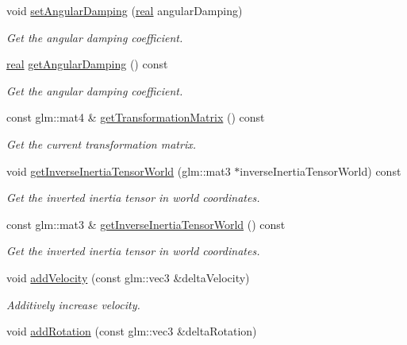 \begin{DoxyCompactItemize}
void \mbox{\hyperlink{classr3_1_1_rigid_body_a53d9954e15f52459386ea82e299c9857}{set\+Angular\+Damping}} (\mbox{\hyperlink{namespacer3_ab2016b3e3f743fb735afce242f0dc1eb}{real}} angular\+Damping)
\begin{DoxyCompactList}\small\item\em Get the angular damping coefficient. \end{DoxyCompactList}\item 
\mbox{\hyperlink{namespacer3_ab2016b3e3f743fb735afce242f0dc1eb}{real}} \mbox{\hyperlink{classr3_1_1_rigid_body_afcef73f6bf5ad38780f39c8ebb5c4af1}{get\+Angular\+Damping}} () const
\begin{DoxyCompactList}\small\item\em Get the angular damping coefficient. \end{DoxyCompactList}\item 
const glm\+::mat4 \& \mbox{\hyperlink{classr3_1_1_rigid_body_a5a96949cb2103e3c4d563849a6c8fb94}{get\+Transformation\+Matrix}} () const
\begin{DoxyCompactList}\small\item\em Get the current transformation matrix. \end{DoxyCompactList}\item 
void \mbox{\hyperlink{classr3_1_1_rigid_body_ae9057a0acbb7dd552a23557ed773b3d5}{get\+Inverse\+Inertia\+Tensor\+World}} (glm\+::mat3 $\ast$inverse\+Inertia\+Tensor\+World) const
\begin{DoxyCompactList}\small\item\em Get the inverted inertia tensor in world coordinates. \end{DoxyCompactList}\item 
const glm\+::mat3 \& \mbox{\hyperlink{classr3_1_1_rigid_body_a03c55eb4a0df2ec179e621ed5de0919a}{get\+Inverse\+Inertia\+Tensor\+World}} () const
\begin{DoxyCompactList}\small\item\em Get the inverted inertia tensor in world coordinates. \end{DoxyCompactList}\item 
void \mbox{\hyperlink{classr3_1_1_rigid_body_aa3303f1eb97e56d75562525b5e317937}{add\+Velocity}} (const glm\+::vec3 \&delta\+Velocity)
\begin{DoxyCompactList}\small\item\em Additively increase velocity. \end{DoxyCompactList}\item 
void \mbox{\hyperlink{classr3_1_1_rigid_body_aaa3f92c7abc8b733a3dac8841ff41b61}{add\+Rotation}} (const glm\+::vec3 \&delta\+Rotation)

\end{DoxyCompactItemize}
